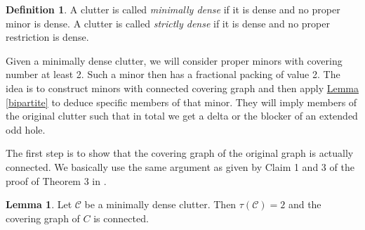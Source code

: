 \documentclass[a4paper, 12pt]{scrbook}
\theoremstyle{definition}
\newtheorem*{definition}{Definition}
\newtheorem{lemma}[theorem]{Lemma}
\begin{document}
   \begin{definition}
       A clutter is called \emph{minimally dense} if it is dense and no proper minor is dense.
       A clutter is called \emph{strictly dense} if it is dense and no proper restriction is dense.
   \end{definition}

   Given a minimally dense clutter, we will consider proper minors with covering number at least 2.
   Such a minor then has a fractional packing of value 2.
   The idea is to construct minors with connected covering graph and then apply \hyperref[bipartite]{Lemma \ref*{bipartite}} to deduce specific members of that minor.
   They will imply members of the original clutter such that in total we get a delta or the blocker of an extended odd hole.

   The first step is to show that the covering graph of the original graph is actually connected.
   We basically use the same argument as given by Claim 1 and 3 of the proof of Theorem 3 in \cite{deltas}.

   \begin{lemma}\label{connectivity}
       Let $\mathcal{C}$ be a minimally dense clutter.
       Then $\tau(\mathcal{C})=2$ and the covering graph of $C$ is connected.
   \end{lemma}
\end{document}
